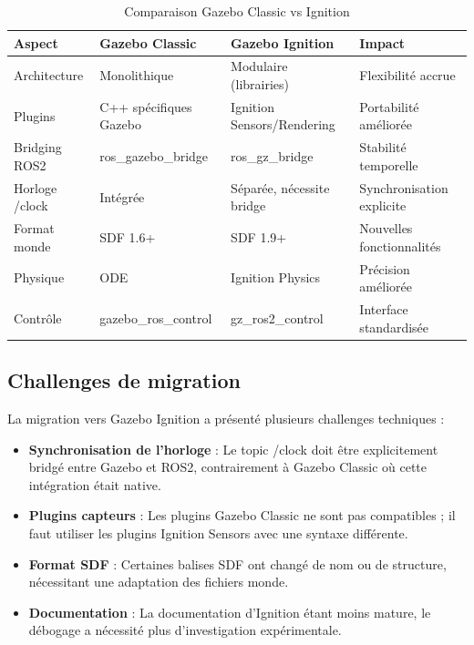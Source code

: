 \documentclass[a4paper,12pt]{report}
\begin{document}
\begin{table}[htbp]
\centering
\caption{Comparaison Gazebo Classic vs Ignition}
\begin{tabular}{@{}llp{4cm}p{4cm}@{}}
\toprule
\textbf{Aspect} & \textbf{Gazebo Classic} & \textbf{Gazebo Ignition} & \textbf{Impact} \\
\midrule
Architecture & Monolithique & Modulaire (librairies) & Flexibilité accrue \\
Plugins & C++ spécifiques Gazebo & Ignition Sensors/Rendering & Portabilité améliorée \\
Bridging ROS2 & ros\_gazebo\_bridge & ros\_gz\_bridge & Stabilité temporelle \\
Horloge /clock & Intégrée & Séparée, nécessite bridge & Synchronisation explicite \\
Format monde & SDF 1.6+ & SDF 1.9+ & Nouvelles fonctionnalités \\
Physique & ODE & Ignition Physics & Précision améliorée \\
Contrôle & gazebo\_ros\_control & gz\_ros2\_control & Interface standardisée \\
\bottomrule
\end{tabular}
\end{table}

\subsection{Challenges de migration}

La migration vers Gazebo Ignition a présenté plusieurs challenges techniques :

\begin{itemize}
    \item \textbf{Synchronisation de l'horloge} : Le topic /clock doit être explicitement bridgé entre Gazebo et ROS2, contrairement à Gazebo Classic où cette intégration était native.
    \item \textbf{Plugins capteurs} : Les plugins Gazebo Classic ne sont pas compatibles ; il faut utiliser les plugins Ignition Sensors avec une syntaxe différente.
    \item \textbf{Format SDF} : Certaines balises SDF ont changé de nom ou de structure, nécessitant une adaptation des fichiers monde.
    \item \textbf{Documentation} : La documentation d'Ignition étant moins mature, le débogage a nécessité plus d'investigation expérimentale.
\end{itemize}
\end{document}
